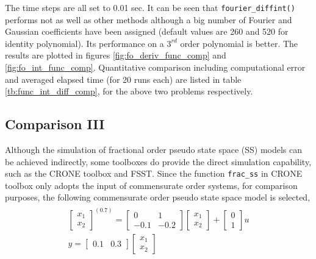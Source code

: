 \documentclass[11pt]{tCON2e}
\theoremstyle{plain}\newtheorem{theorem}{Theorem}
\theoremstyle{definition}
\theoremstyle{remark}
\begin{document}
The time steps are all set to 0.01 sec. It can be seen that {\tt fourier\_diffint()} performs not as well as other methods although a big number of Fourier and Gaussian coefficients have been assigned (default values are 260 and 520 for identity polynomial). Its performance on a $3^{rd}$ order polynomial is better. The results are plotted in figures \ref{fig:fo_deriv_func_comp} and \ref{fig:fo_int_func_comp}. Quantitative comparison including computational error and averaged elapsed time (for 20 runs each) are listed in table \ref{tb:func_int_diff_comp}, for the above two problems respectively.



\subsection{Comparison III}
Although the simulation of fractional order pseudo state space (SS) models can be achieved indirectly, some toolboxes do provide the direct simulation capability, such as the CRONE toolbox and FSST. Since the function {\tt frac\_ss} in CRONE toolbox only adopts the input of commensurate order systems, for comparison purposes, the following commensurate order pseudo state space model is selected,
\begin{eqnarray}
\label{eqn:FO_SS}
\begin{array}{l}
{\left[ {\begin{array}{*{20}{c}}
{{x_1}}\\
{{x_2}}
\end{array}} \right]^{\left( {0.7} \right)}} = \left[ {\begin{array}{*{20}{c}}
0&1\\
{ - 0.1}&{ - 0.2}
\end{array}} \right]\left[ {\begin{array}{*{20}{c}}
{{x_1}}\\
{{x_2}}
\end{array}} \right] + \left[ {\begin{array}{*{20}{c}}
0\\
1
\end{array}} \right]u\\
y = \left[ {\begin{array}{*{20}{c}}
{0.1}&{0.3}
\end{array}} \right]\left[ {\begin{array}{*{20}{c}}
{{x_1}}\\
{{x_2}}
\end{array}} \right]
\end{array}
\end{eqnarray}
\end{document}
